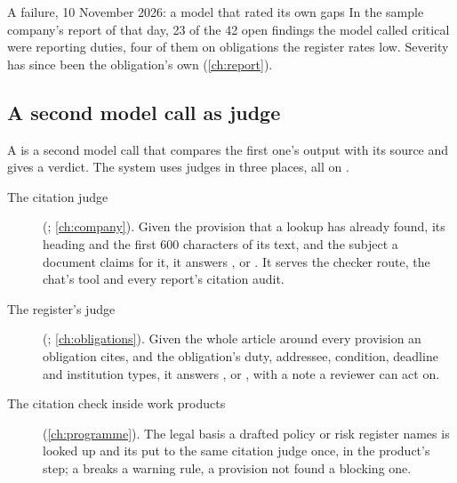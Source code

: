 \begin{lessonbox}{A failure, 10 November 2026: a model that rated its own gaps}
In the sample company's report of that day, 23 of the 42 open findings the model called
critical were reporting duties, four of them on obligations the register rates low. Severity
has since been the obligation's own (\cref{ch:report}).
\end{lessonbox}

\subsection{A second model call as judge}\label{sec:control:judges}

A  is a second model call that compares the first one's output with its source
and gives a verdict. The system uses judges in three places, all on .

\begin{description}
  \item[The citation judge] (; \cref{ch:company}). Given the
    provision that a lookup has already found, its heading and the first 600 characters of
    its text, and the subject a document claims for it, it answers ,
     or . It serves the checker route, the chat's tool
     and every report's citation audit.
  \item[The register's judge] (; \cref{ch:obligations}).
    Given the whole article around every provision an obligation cites, and the obligation's
    duty, addressee, condition, deadline and institution types, it answers
    ,  or , with a note a reviewer can act on.
  \item[The citation check inside work products] (\cref{ch:programme}). The legal basis a
    drafted policy or risk register names is looked up and its  put to the same
    citation judge once, in the product's  step; a  breaks a
    warning rule, a provision not found a blocking one.
\end{description}

